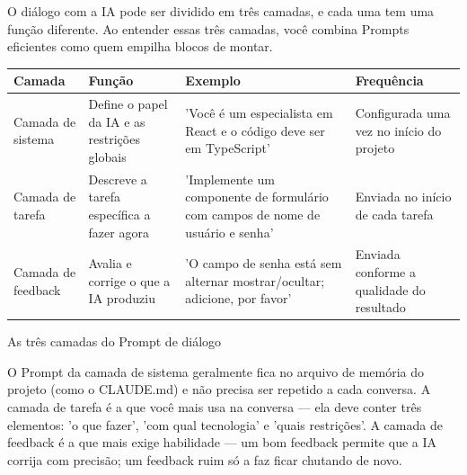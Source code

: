 


O diálogo com a IA pode ser dividido em três camadas, e cada uma tem uma função diferente. Ao entender essas três camadas, você combina Prompts eficientes como quem empilha blocos de montar.

\begin{center}
\begin{tabularx}{\linewidth}{|X|X|X|X|}
\hline
\textbf{Camada} & \textbf{Função} & \textbf{Exemplo} & \textbf{Frequência} \tabularnewline
\hline
Camada de sistema & Define o papel da IA e as restrições globais & 'Você é um especialista em React e o código deve ser em TypeScript' & Configurada uma vez no início do projeto \tabularnewline
Camada de tarefa & Descreve a tarefa específica a fazer agora & 'Implemente um componente de formulário com campos de nome de usuário e senha' & Enviada no início de cada tarefa \tabularnewline
Camada de feedback & Avalia e corrige o que a IA produziu & 'O campo de senha está sem alternar mostrar/ocultar; adicione, por favor' & Enviada conforme a qualidade do resultado \tabularnewline
\hline
\end{tabularx}
\end{center}

\begin{center}\small\color{gray}As três camadas do Prompt de diálogo\end{center}

O Prompt da camada de sistema geralmente fica no arquivo de memória do projeto (como o CLAUDE.md) e não precisa ser repetido a cada conversa. A camada de tarefa é a que você mais usa na conversa — ela deve conter três elementos: 'o que fazer', 'com qual tecnologia' e 'quais restrições'. A camada de feedback é a que mais exige habilidade — um bom feedback permite que a IA corrija com precisão; um feedback ruim só a faz ficar chutando de novo.

